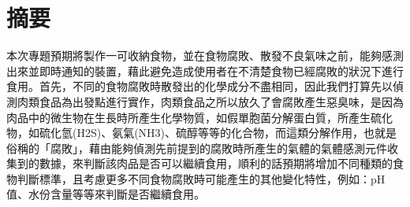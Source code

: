 \chapter*{摘要}

本次專題預期將製作一可收納食物，並在食物腐敗、散發不良氣味之前，能夠感測出來並即時通知的裝置，藉此避免造成使用者在不清楚食物已經腐敗的狀況下進行食用。首先，不同的食物腐敗時散發出的化學成分不盡相同，因此我們打算先以偵測肉類食品為出發點進行實作，肉類食品之所以放久了會腐敗產生惡臭味，是因為肉品中的微生物在生長時所產生化學物質，如假單胞菌分解蛋白質，所產生硫化物，如硫化氫(H2S)、氨氣(NH3)、硫醇等等的化合物，而這類分解作用，也就是俗稱的「腐敗」，藉由能夠偵測先前提到的腐敗時所產生的氣體的氣體感測元件收集到的數據，來判斷該肉品是否可以繼續食用，順利的話預期將增加不同種類的食物判斷標準，且考慮更多不同食物腐敗時可能產生的其他變化特性，例如：pH值、水份含量等等來判斷是否繼續食用。 